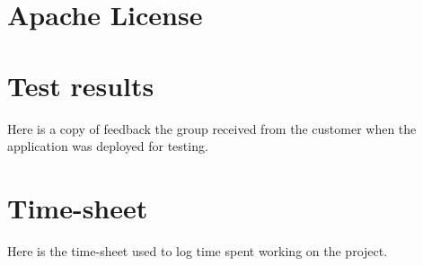 \begin{appendices}




\chapter{Apache License}

\label{appendix:license}



\chapter{Test results}
Here is a copy of feedback the group received from the customer when the application was deployed for testing. 
\label{appendix:testResults}


\chapter{Time-sheet}
Here is the time-sheet used to log time spent working on the project.

\end{appendices}